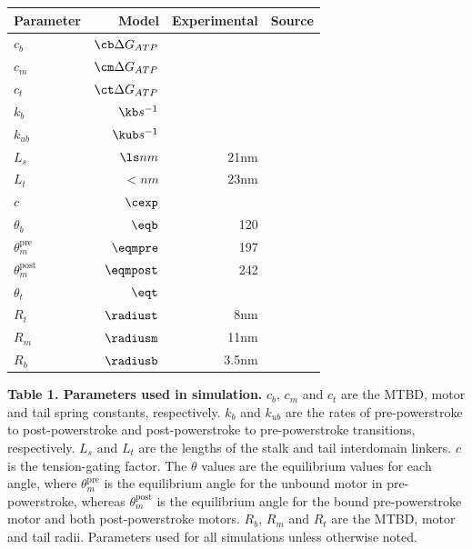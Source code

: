 \documentclass[9pt,twocolumn,twoside]{pnas-new}
\begin{document}
\begin{minipage}{\linewidth}%
  \centering
  \begin{tabular}{lrrr}
    Parameter & Model & Experimental & Source \\
    \midrule
    $c_b$ & $\cb \Delta G_{ATP}$ &  & \\
    $c_m$ & $\cm \Delta G_{ATP}$ &  & \\
    $c_t$ & $\ct \Delta G_{ATP}$ &  & \\
    $k_b$ & $\kb s^{-1}$&  & \\
    $k_{ub}$ & $\kub s^{-1}$ & & \\
    $L_s$ & $\ls nm$ & 21nm & \cite{burgess-paper, 3vkh-cite, carter-paper}\\
    $L_t$ & $\lt nm$ & 23nm & \cite{burgess-paper, 3vkh-cite, carter-paper}\\
    $c$ & $\cexp$ & & \\
    $\theta_b$ & $\eqb$ &  120 & \cite{leschziner} \\
    $\theta_m^{\mbox{pre}}$ & $\eqmpre$ &  197 & \cite{burgess-paper}\\
    $\theta_m^{\mbox{post}}$ & $\eqmpost$ & 242 & \cite{burgess-paper}\\
    $\theta_t$ & $\eqt$ &  & \\
    $R_t$ & $\radiust$ & 8nm & \cite{burgess-paper}\\
    $R_m$ & $\radiusm$ & 11nm & \cite{burgess-paper}\\
    $R_b$ & $\radiusb$ & 3.5nm & \cite{burgess-paper}\\
    \bottomrule
  \end{tabular}

  \begin{minipage}{\linewidth}
    \small
    \textbf{Table 1. Parameters used in simulation.} $c_b$, $c_m$ and $c_t$ are the MTBD, motor and tail spring constants, respectively. $k_b$ and $k_{ub}$ are the rates of pre-powerstroke to post-powerstroke and post-powerstroke to pre-powerstroke transitions, respectively. $L_s$ and $L_t$ are the lengths of the stalk and tail interdomain linkers. $c$ is the tension-gating factor. The $\theta$ values are the equilibrium values for each angle, where $\theta_m^{\mbox{pre}}$ is the equilibrium angle for the unbound motor in pre-powerstroke, whereas $\theta_m^{\mbox{post}}$ is the equilibrium angle for the bound pre-powerstroke motor and both post-powerstroke motors. $R_b$, $R_m$ and $R_t$ are the MTBD, motor and tail radii. Parameters used for all simulations unless otherwise noted.
  \end{minipage}
  \label{tab:params}

\end{minipage}
\end{document}
